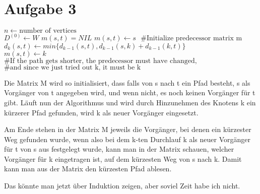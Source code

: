 \documentclass{article}
\begin{document}
\section*{Aufgabe 3}

\begin{algorithm}
\begin{algorithmic}[5]

\State $ n \gets \text{number of vertices}$ \\
\State $D^{(0)} \gets W$ 
\State $m(s,t) = NIL$
\Else  
\State $m(s,t) \gets s$
\State $\text{ \#Initialize predecessor matrix m}$
\EndIf
\EndFor
\EndFor
{}
\State $d_k(s,t) \gets min\{d_{k-1}(s,t), d_{k-1}(s,k) + d_{k-1}(k,t)\}$\\
\State $m(s,t) \gets k$ \\
\State $\text{\# If the path gets shorter, the predecessor must have changed,}$
\State $\text{\# and since we just tried out k, it must be k}$
\EndIf
\EndFor
\EndFor
\EndFor


\EndFunction

\end{algorithmic}
\end{algorithm}

Die Matrix M wird so initialisiert, dass falls von s nach t ein Pfad 
besteht, s als Vorgänger von t angegeben wird, und wenn nicht, es noch 
keinen Vorgänger für t gibt. 
Läuft nun der Algorithmus und wird durch Hinzunehmen des Knotens k ein 
kürzerer Pfad gefunden, wird k als neuer Vorgänger eingesetzt. 

Am Ende stehen in der Matrix M jeweils die Vorgänger, bei denen ein 
kürzester Weg gefunden wurde, wenn also bei dem k-ten Durchlauf k als 
neuer Vorgänger für t von s aus festgelegt wurde, kann man in der 
Matrix schauen, welcher Vorgänger für k eingetragen ist, auf dem 
kürzesten Weg von s nach k. Damit kann man aus der Matrix den kürzesten 
Pfad ablesen. 

Das könnte man jetzt über Induktion zeigen, aber soviel Zeit habe 
ich nicht. 
\end{document}

